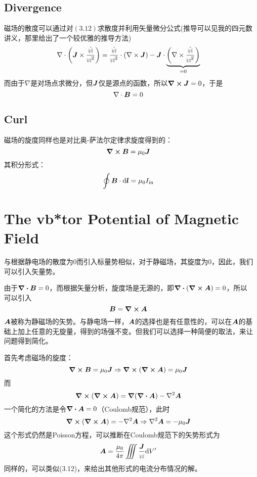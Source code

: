 \documentclass[14pt,oneside]{book}
\def\rr{{\mbox{$\resizebox{.09in}{.08in}{\texttt{[image: ScriptR]}}$}}}
\def\br{{\mbox{$\resizebox{.09in}{.08in}{\texttt{[image: BoldR]}}$}}}
\begin{document}
\begin{large}
\subsection{Divergence}
磁场的散度可以通过对$(3.12)$求散度并利用矢量微分公式(推导可以见我的四元数讲义，那里给出了一个较优雅的推导方法)
\begin{equation}
\nabla \cdot\left(\vb*{J} \times \frac{\hat{\br}}{\rr^2}\right)=\frac{\hat{\br}}{\rr^2} \cdot(\nabla \times \vb*{J})-\vb*{J} \cdot\underbrace{\left(\nabla \times \frac{\hat{\br}}{\rr^2}\right)}_{=0}
\end{equation}
而由于$\nabla$是对场点求微分，但$\vb*{J}$仅是源点的函数，所以$\curl{\vb*{J}}=0$，于是
\begin{equation}
  \nabla\cdot \vb*{B}=0
\end{equation}

\subsection{Curl}
磁场的旋度同样也是对比奥-萨法尔定律求旋度得到的：
\begin{equation}
  \curl{\vb*{B}}=\mu_0 \vb*{J}
\end{equation}
其积分形式：
\begin{equation}
  \oint \vb*{B}\cdot \dd \vb*{l} =\mu_0 I_{\text{in}}
\end{equation}

\section{The vb*tor Potential of Magnetic Field}
与根据静电场的散度为0而引入标量势相似，对于静磁场，其旋度为0，因此，我们可以引入矢量势。

由于$\div{\vb*{B}}=0$，而根据矢量分析，旋度场是无源的，即$\div{(\curl{\vb*{A}}})=0$，所以可以引入
\begin{equation}
  \vb*{B}=\curl{\vb*{A}}
\end{equation}
$\vb*{A}$被称为静磁场的矢势。与静电场一样，$\vb*{A}$的选择也是有任意性的，可以在$\vb*{A}$的基础上加上任意的无旋量，得到的场强不变。但我们可以选择一种简便的取法，来让问题得到简化。

首先考虑磁场的旋度：
\begin{equation}
  \curl{\vb*{B}}=\mu_0 \vb*{J}\Rightarrow \curl{(\curl{\vb*{A}})}=\mu_0 \vb*{J}
\end{equation}
而
\begin{equation}
  \curl{(\curl{\vb*{A}})}=\vb*{\nabla}(\div{\vb*{A}})-\nabla^2 \vb*{A}
\end{equation}
一个简化的方法是令$\div{\vb*{A}}=0$（Coulomb规范），此时
\begin{equation}
  \curl{(\curl{\vb*{A}})}=-\nabla^2 \vb*{A}\Rightarrow \nabla^2 \vb*{A}=-\mu_0\vb*{J}
\end{equation}
这个形式仍然是Poisson方程，可以推断在Coulomb规范下的矢势形式为
\begin{equation}
  \vb*{A}=\frac{\mu_0}{4\pi}\iiint \frac{\vb*{J}}{\rr}\dd V'
\end{equation}
同样的，可以类似(3.12)，来给出其他形式的电流分布情况的解。

\end{large}
\end{document}

